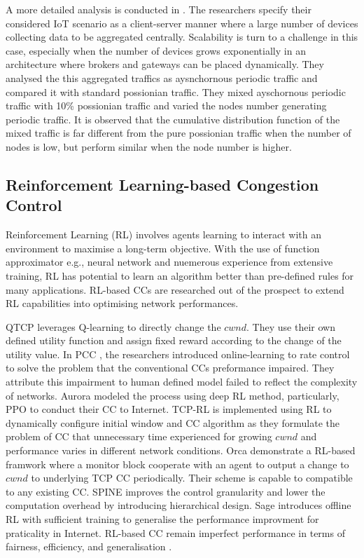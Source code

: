 \documentclass[journal]{IEEEtran}
\begin{document}
A more detailed analysis is conducted in \cite{metzger2019modeling}. The researchers specify their considered IoT scenario as a client-server manner where a large number of devices collecting data to be aggregated centrally. Scalability is turn to a challenge in this case, especially when the number of devices grows exponentially in an architecture where brokers and gateways can be placed dynamically.
They analysed the this aggregated traffics as aysnchornous periodic traffic and compared it with standard possionian traffic. They mixed ayschornous periodic traffic with 10\% possionian traffic and varied the nodes number generating periodic traffic. It is observed that the cumulative distribution function of the mixed traffic is far different from the pure possionian traffic when the number of nodes is low, but perform similar when the node number is higher.

\subsection{Reinforcement Learning-based Congestion Control}
Reinforcement Learning (RL) involves agents learning to interact with an environment to maximise a long-term objective. With the use of function approximator e.g., neural network and nuemerous experience from extensive training, RL has potential to learn an algorithm better than pre-defined rules for many applications. RL-based CCs are researched out of the prospect to extend RL capabilities into optimising network performances.

QTCP \cite{li2018qtcp} leverages Q-learning to directly change the $cwnd$. They use their own defined utility function and assign fixed reward according to the change of the utility value. In PCC \cite{dong2018pcc}, the researchers introduced online-learning to rate control to solve the problem that the conventional CCs preformance impaired. They attribute this impairment to human defined model failed to reflect the complexity of networks. Aurora \cite{jay2019deep} modeled the process using deep RL method, particularly, PPO to conduct their CC to Internet. TCP-RL \cite{nie2019dynamic} is implemented using RL to dynamically configure initial window and CC algorithm as they formulate the problem of CC that unnecessary time experienced for growing $cwnd$ and performance varies in different network conditions. Orca \cite{abbasloo2020classic} demonstrate a RL-based framwork where a monitor block cooperate with an agent to output a change to $cwnd$ to underlying TCP CC periodically. Their scheme is capable to compatible to any existing CC. SPINE \cite{tian2022spine} improves the control granularity and lower the computation overhead by introducing hierarchical design. Sage \cite{yen2023computers} introduces offline RL with sufficient training to generalise the performance improvment for praticality in Internet. RL-based CC remain imperfect performance in terms of fairness, efficiency, and generalisation \cite{giacomoni2024reinforcement}.
\end{document}
